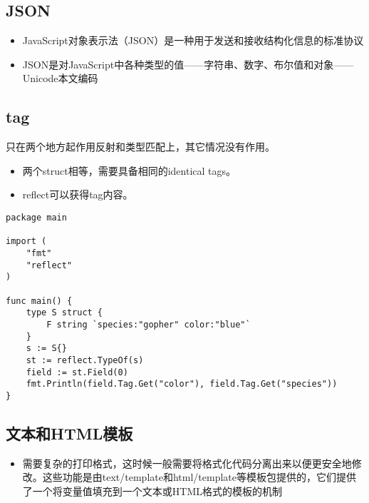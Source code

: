 \hypertarget{json}{%
\subsection{JSON}\label{json}}

\begin{itemize}
\tightlist
\item
  JavaScript对象表示法（JSON）是一种用于发送和接收结构化信息的标准协议
\item
  JSON是对JavaScript中各种类型的值------字符串、数字、布尔值和对象------Unicode本文编码
\end{itemize}

\hypertarget{tag}{%
\subsection{tag}\label{tag}}

只在两个地方起作用反射和类型匹配上，其它情况没有作用。

\begin{itemize}
\tightlist
\item
  两个struct相等，需要具备相同的identical tags。
\item
  reflect可以获得tag内容。
\end{itemize}

\begin{verbatim}
package main

import (
    "fmt"
    "reflect"
)

func main() {
    type S struct {
        F string `species:"gopher" color:"blue"`
    }
    s := S{}
    st := reflect.TypeOf(s)
    field := st.Field(0)
    fmt.Println(field.Tag.Get("color"), field.Tag.Get("species"))
}
\end{verbatim}

\hypertarget{ux6587ux672cux548chtmlux6a21ux677f}{%
\subsection{文本和HTML模板}\label{ux6587ux672cux548chtmlux6a21ux677f}}

\begin{itemize}
\tightlist
\item
  需要复杂的打印格式，这时候一般需要将格式化代码分离出来以便更安全地修改。这些功能是由text/template和html/template等模板包提供的，它们提供了一个将变量值填充到一个文本或HTML格式的模板的机制
\end{itemize}
